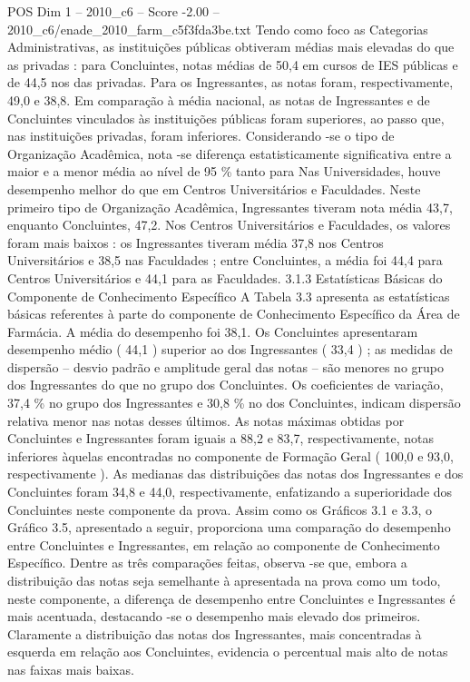 \begin{textsample}{POS Dim 1 – 2010\_c6 – Score -2.00 – 2010\_c6/enade\_2010\_farm\_c5f3fda3be.txt}
Tendo como foco as Categorias Administrativas, as instituições públicas obtiveram médias mais elevadas do que as privadas : para Concluintes, notas médias de 50,4 em cursos de IES públicas e de 44,5 nos das privadas.
Para os Ingressantes, as notas foram, respectivamente, 49,0 e 38,8.
Em comparação à média nacional, as notas de Ingressantes e de Concluintes vinculados às instituições públicas foram superiores, ao passo que, nas instituições privadas, foram inferiores.
Considerando -se o tipo de Organização Acadêmica, nota -se diferença estatisticamente significativa entre a maior e a menor média ao nível de 95 \% tanto para Nas Universidades, houve desempenho melhor do que em Centros Universitários e Faculdades.
Neste primeiro tipo de Organização Acadêmica, Ingressantes tiveram nota média 43,7, enquanto Concluintes, 47,2.
Nos Centros Universitários e Faculdades, os valores foram mais baixos : os Ingressantes tiveram média 37,8 nos Centros Universitários e 38,5 nas Faculdades ; entre Concluintes, a média foi 44,4 para Centros Universitários e 44,1 para as Faculdades. 3.1.3 Estatísticas Básicas do Componente de Conhecimento Específico A Tabela 3.3 apresenta as estatísticas básicas referentes à parte do componente de Conhecimento Específico da Área de Farmácia.
A média do desempenho foi 38,1.
Os Concluintes apresentaram desempenho médio ( 44,1 ) superior ao dos Ingressantes ( 33,4 ) ; as medidas de dispersão – desvio padrão e amplitude geral das notas – são menores no grupo dos Ingressantes do que no grupo dos Concluintes.
Os coeficientes de variação, 37,4 \% no grupo dos Ingressantes e 30,8 \% no dos Concluintes, indicam dispersão relativa menor nas notas desses últimos.
As notas máximas obtidas por Concluintes e Ingressantes foram iguais a 88,2 e 83,7, respectivamente, notas inferiores àquelas encontradas no componente de Formação Geral ( 100,0 e 93,0, respectivamente ).
As medianas das distribuições das notas dos Ingressantes e dos Concluintes foram 34,8 e 44,0, respectivamente, enfatizando a superioridade dos Concluintes neste componente da prova.
Assim como os Gráficos 3.1 e 3.3, o Gráfico 3.5, apresentado a seguir, proporciona uma comparação do desempenho entre Concluintes e Ingressantes, em relação ao componente de Conhecimento Específico.
Dentre as três comparações feitas, observa -se que, embora a distribuição das notas seja semelhante à apresentada na prova como um todo, neste componente, a diferença de desempenho entre Concluintes e Ingressantes é mais acentuada, destacando -se o desempenho mais elevado dos primeiros.
Claramente a distribuição das notas dos Ingressantes, mais concentradas à esquerda em relação aos Concluintes, evidencia o percentual mais alto de notas nas faixas mais baixas.

\end{textsample}
